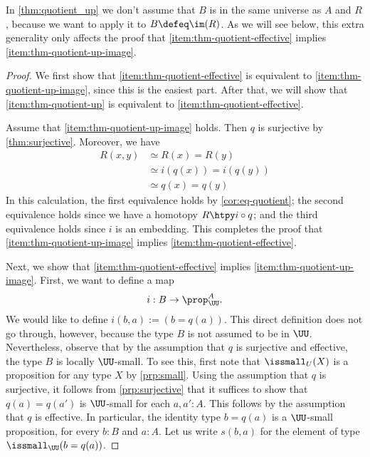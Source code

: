 In \cref{thm:quotient_up} we don't assume that $B$ is in the same universe as $A$ and $R$, because we want to apply it to $B\defeq\im(R)$. As we will see below, this extra generality only affects the proof that \ref{item:thm-quotient-effective} implies \ref{item:thm-quotient-up-image}.

\begin{proof}
  We first show that \ref{item:thm-quotient-effective} is equivalent to \ref{item:thm-quotient-up-image}, since this is the easiest part. After that, we will show that \ref{item:thm-quotient-up} is equivalent to \ref{item:thm-quotient-effective}.

  Assume that \ref{item:thm-quotient-up-image} holds. Then $q$ is surjective by \cref{thm:surjective}. Moreover, we have
  \begin{align*}
    R(x,y) & \simeq R(x)=R(y) \\
           & \simeq i(q(x))=i(q(y)) \\
           & \simeq q(x)=q(y)
  \end{align*}
  In this calculation, the first equivalence holds by \cref{cor:eq-quotient}; the second equivalence holds since we have a homotopy $R\htpy i\circ q$; and the third equivalence holds since $i$ is an embedding. This completes the proof that \ref{item:thm-quotient-up-image} implies \ref{item:thm-quotient-effective}.

  Next, we show that \ref{item:thm-quotient-effective} implies \ref{item:thm-quotient-up-image}. First, we want to define a map 
  \begin{equation*}
    i:B\to\prop_\UU^A.
  \end{equation*}
  We would like to define $i(b,a):=(b=q(a))$. This direct definition does not go through, however, because the type $B$ is not assumed to be in $\UU$. Nevertheless, observe that by the assumption that $q$ is surjective and effective, the type $B$ is locally $\UU$-small. To see this, first note that $\issmall_U(X)$ is a proposition for any type $X$ by \cref{prp:small}. Using the assumption that $q$ is surjective, it follows from \cref{prp:surjective} that it suffices to show that $q(a)=q(a')$ is $\UU$-small for each $a,a':A$. This follows by the assumption that $q$ is effective. In particular, the identity type $b=q(a)$ is a $\UU$-small proposition, for every $b:B$ and $a:A$. Let us write $s(b,a)$ for the element of type $\issmall_\UU(b=q(a))$.


\end{proof}
